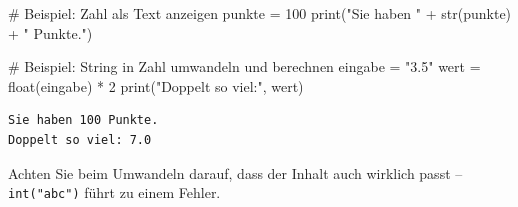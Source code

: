 \documentclass[
  letterpaper,
  DIV=11,
  numbers=noendperiod]{scrreprt}
\newenvironment{Shaded}{\begin{snugshade}}{\end{snugshade}}
\newcommand{\BuiltInTok}[1]{\textcolor[rgb]{0.00,0.23,0.31}{#1}}
\newcommand{\CommentTok}[1]{\textcolor[rgb]{0.37,0.37,0.37}{#1}}
\newcommand{\DecValTok}[1]{\textcolor[rgb]{0.68,0.00,0.00}{#1}}
\newcommand{\NormalTok}[1]{\textcolor[rgb]{0.00,0.23,0.31}{#1}}
\newcommand{\OperatorTok}[1]{\textcolor[rgb]{0.37,0.37,0.37}{#1}}
\newcommand{\StringTok}[1]{\textcolor[rgb]{0.13,0.47,0.30}{#1}}
\begin{document}
\begin{Shaded}
\begin{Highlighting}[]
\CommentTok{\# Beispiel: Zahl als Text anzeigen}
\NormalTok{punkte }\OperatorTok{=} \DecValTok{100}
\BuiltInTok{print}\NormalTok{(}\StringTok{"Sie haben "} \OperatorTok{+} \BuiltInTok{str}\NormalTok{(punkte) }\OperatorTok{+} \StringTok{" Punkte."}\NormalTok{)}

\CommentTok{\# Beispiel: String in Zahl umwandeln und berechnen}
\NormalTok{eingabe }\OperatorTok{=} \StringTok{"3.5"}
\NormalTok{wert }\OperatorTok{=} \BuiltInTok{float}\NormalTok{(eingabe) }\OperatorTok{*} \DecValTok{2}
\BuiltInTok{print}\NormalTok{(}\StringTok{"Doppelt so viel:"}\NormalTok{, wert)}
\end{Highlighting}
\end{Shaded}

\begin{verbatim}
Sie haben 100 Punkte.
Doppelt so viel: 7.0
\end{verbatim}

Achten Sie beim Umwandeln darauf, dass der Inhalt auch wirklich passt --
\texttt{int("abc")} führt zu einem Fehler.
\end{document}
